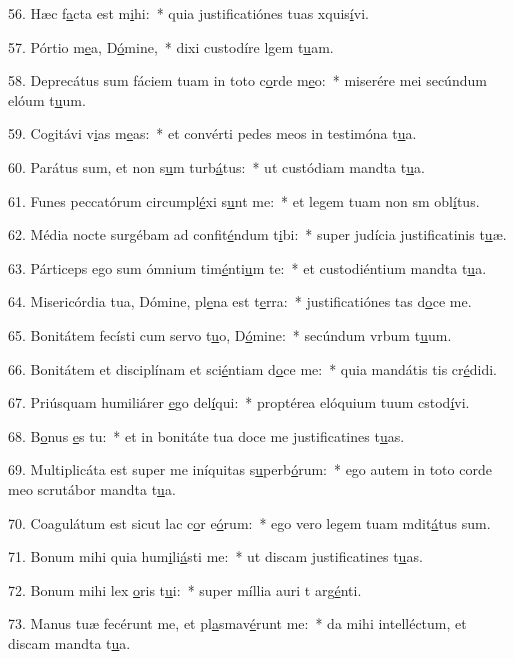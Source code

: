 56. Hæc f\uline{a}cta est m\uline{i}hi:~* quia justificatiónes tuas xquis\uline{í}vi.\par 
57. Pórtio m\uline{e}a, D\uline{ó}mine,~* dixi custodíre lgem t\uline{u}am.\par 
58. Deprecátus sum fáciem tuam in toto c\uline{o}rde m\uline{e}o:~* miserére mei secúndum elóum t\uline{u}um.\par 
59. Cogitávi v\uline{i}as m\uline{e}as:~* et convérti pedes meos in testimóna t\uline{u}a.\par 
60. Parátus sum, et non s\uline{u}m turb\uline{á}tus:~* ut custódiam mandta t\uline{u}a.\par 
61. Funes peccatórum circumpl\uline{é}xi s\uline{u}nt me:~* et legem tuam non sm obl\uline{í}tus.\par 
62. Média nocte surgébam ad confit\uline{é}ndum t\uline{i}bi:~* super judícia justificatinis t\uline{u}æ.\par 
63. Párticeps ego sum ómnium tim\uline{é}nti\uline{u}m te:~* et custodiéntium mandta t\uline{u}a.\par 
64. Misericórdia tua, Dómine, pl\uline{e}na est t\uline{e}rra:~* justificatiónes tas d\uline{o}ce me.\par 
65. Bonitátem fecísti cum servo t\uline{u}o, D\uline{ó}mine:~* secúndum vrbum t\uline{u}um.\par 
66. Bonitátem et disciplínam et sci\uline{é}ntiam d\uline{o}ce me:~* quia mandátis tis cr\uline{é}didi.\par 
67. Priúsquam humiliárer \uline{e}go del\uline{í}qui:~* proptérea elóquium tuum cstod\uline{í}vi.\par 
68. B\uline{o}nus \uline{e}s tu:~* et in bonitáte tua doce me justificatines t\uline{u}as.\par 
69. Multiplicáta est super me iníquitas s\uline{u}perb\uline{ó}rum:~* ego autem in toto corde meo scrutábor mandta t\uline{u}a.\par 
70. Coagulátum est sicut lac c\uline{o}r e\uline{ó}rum:~* ego vero legem tuam mdit\uline{á}tus sum.\par 
71. Bonum mihi quia hum\uline{i}li\uline{á}sti me:~* ut discam justificatines t\uline{u}as.\par 
72. Bonum mihi lex \uline{o}ris t\uline{u}i:~* super míllia auri t arg\uline{é}nti.\par 
73. Manus tuæ fecérunt me, et pl\uline{a}smav\uline{é}runt me:~* da mihi intelléctum, et discam mandta t\uline{u}a.\par 
